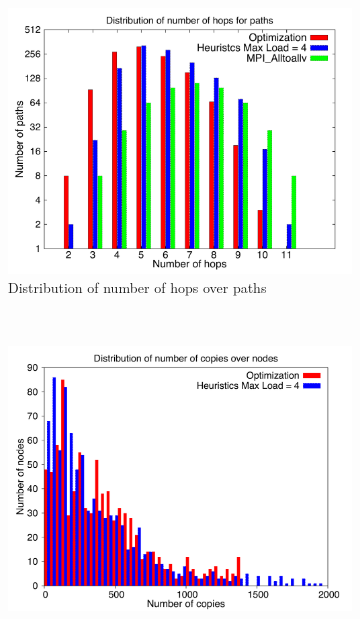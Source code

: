 \begin{figure}[!htbp]
        \centering
        \begin{subfigure}[b]{0.49\textwidth}
                \includegraphics[width=\textwidth]{report_figures/constantr/3_1024/hop_histo.pdf}
                \caption{Distribution of number of hops over paths}
                \label{fig:3_1024_hop}
        \end{subfigure}%
        ~ %
        \begin{subfigure}[b]{0.49\textwidth}
                \includegraphics[width=\textwidth]{report_figures/constantr/3_1024/copy_histo.pdf}

\end{subfigure}
\end{figure}
